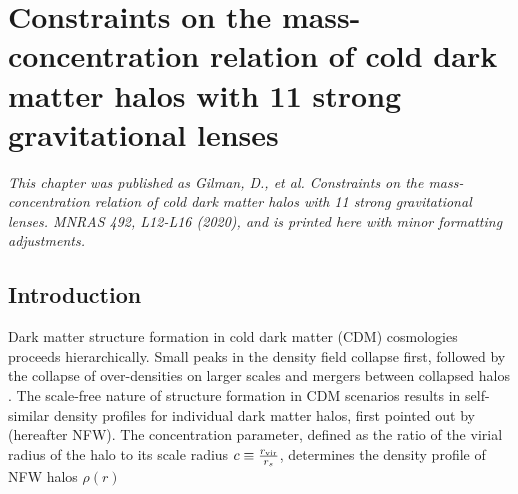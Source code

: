\def\rein{{$R_{\rm{Ein}}$}}
\def\cmg{{\rm{$\rm{cm}^2 \rm{g}^{-1}$}}}
\def\msun{{M_{\odot}}}
\def\sigmasidm{{$\sigma_{\rm{SIDM}}$}}
\def\dlos{{\delta_{\rm{los}}}}
\def\mhm{{m_{\rm{hm}}}}

\def\sevenonesigma{{$c = 15_{-8}^{+9}$}}
\def\eightonesigma{{$c = 12_{-5}^{+6}$}}
\def\nineonesigma{{$c = 10_{-4}^{+7}$}}

\def\seventwosigma{{$c = 15_{-11}^{+18}$}}
\def\eighttwosigma{{$c = 12_{-9}^{+15}$}}
\def\ninetwosigma{{$c = 10_{-7}^{+14}$}}

\def\data{{\bf{d}_{\rm{n}}}}
\def\datasim{{\bf{d}_{\rm{n}}^{\prime}}}
\def\msub{{\bf{m}_{\rm{sub}}}}
\def\qsub{{\bf{q}_{\rm{s}}}}
\def\fsub{{{f}_{\rm{sub}}}}
\def\fsubmean{{\bar{f}_{\rm{sub}}}}
\def\qmac{{\bf{M}}}
\def\qm{{}{\bf{M}}}
\def\sigmasubmean{0.035 \rm{kpc^{-2}}}
\def\sigmasubonesigma{0.025 < \Sigma_{\rm{sub}} < 0.05 \rm{kpc^{-2}}}
\def\sigmasubtwosigma{0.01 < \Sigma_{\rm{sub}} < 0.075 \rm{kpc^{-2}}}
\def\msubmean{3.9 \times 10^7 \msun \rm{kpc^{-2}}}
\def\msubonesigmalow{2.8 \times 10^7 \msun \rm{kpc^{-2}}}
\def\msubonesigmahigh{5.8 \times 10^7 \msun \rm{kpc^{-2}}}
\def\msubtwosigmalow{1.1 \times 10^7 \msun \rm{kpc^{-2}}}
\def\msubtwosigmalow{8.3 \times 10^7 \msun \rm{kpc^{-2}}}

\chapter{Constraints on the mass-concentration relation of cold dark matter halos with 11 strong gravitational lenses}
\textit{This chapter was published as Gilman, D., et al. Constraints on the mass-concentration relation of cold dark matter halos with 11 strong gravitational lenses. MNRAS 492, L12-L16 (2020), and is printed here with minor formatting adjustments.}

\section{Introduction}
Dark matter structure formation in cold dark matter (CDM) cosmologies proceeds hierarchically. Small peaks in the density field collapse first, followed by the collapse of over-densities on larger scales and mergers between collapsed halos \citep{Navarro++97,Moore++99}. The scale-free nature of structure formation in CDM scenarios results in self-similar density profiles for individual dark matter halos, first pointed out by \citet{Navarro++96} (hereafter NFW). The concentration parameter, defined as the ratio of the virial radius of the halo to its scale radius $c \equiv \frac{r_{\rm{vir}}}{r_s}$, determines the density profile of NFW halos $\rho\left(r\right)$

